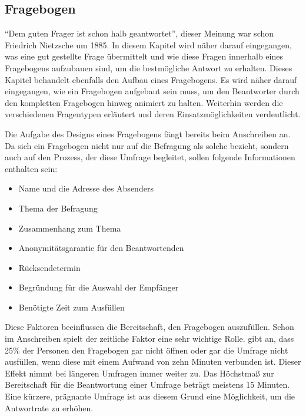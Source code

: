 \subsection{Fragebogen}
\label{acqusition}
\enquote{Dem guten Frager ist schon halb geantwortet}, dieser Meinung war schon Friedrich Nietzsche um 1885.\autocite{Nietzsche}
In diesem Kapitel wird näher darauf eingegangen, was eine gut gestellte Frage übermittelt und wie diese Fragen innerhalb eines Fragebogens aufzubauen sind, um die bestmögliche Antwort zu erhalten.
Dieses Kapitel behandelt ebenfalls den Aufbau eines Fragebogens. 
Es wird näher darauf eingegangen, wie ein Fragebogen aufgebaut sein muss, um den Beantworter durch den kompletten Fragebogen hinweg animiert zu halten. 
Weiterhin werden die verschiedenen Fragentypen erläutert und deren Einsatzmöglichkeiten verdeutlicht. 

Die Aufgabe des Designs eines Fragebogens fängt bereits beim Anschreiben an.
Da sich ein Fragebogen nicht nur auf die Befragung als solche bezieht, sondern auch auf den Prozess, der diese Umfrage begleitet, sollen folgende Informationen enthalten sein:\autocite[Vgl.][S. 29]{2003Fragebogen} %
% 
\begin{itemize}
	\item Name und die Adresse des Absenders
	\item Thema der Befragung
	\item Zusammenhang zum Thema
	\item Anonymitätsgarantie für den Beantwortenden
	\item Rücksendetermin
	\item Begründung für die Auswahl der Empfänger 
	\item Benötigte Zeit zum Ausfüllen 
\end{itemize}
% 
Diese Faktoren beeinflussen die Bereitschaft, den Fragebogen auszufüllen.
Schon im Anschreiben spielt der zeitliche Faktor eine sehr wichtige Rolle.
\citeauthor{NFP} gibt an, dass 25\% der Personen den Fragebogen gar nicht öffnen oder gar die Umfrage nicht ausfüllen, wenn diese mit einem Aufwand von zehn Minuten verbunden ist.
Dieser Effekt nimmt bei längeren Umfragen immer weiter zu.\autocite[Vgl.][S. 353]{NFP}
Das Höchstmaß zur Bereitschaft für die Beantwortung einer Umfrage beträgt meistens 15 Minuten.\autocite[Vgl.][S. 37]{2009Fragebogen}%
Eine kürzere, prägnante Umfrage ist aus diesem Grund eine Möglichkeit, um die Antwortrate zu erhöhen.

